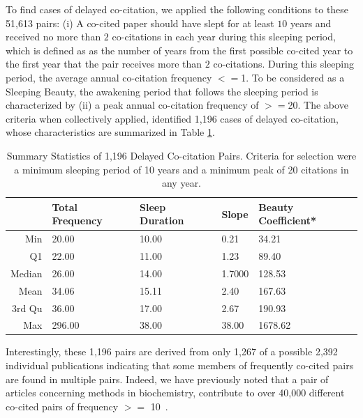 \documentclass[utf8]{frontiersSCNS}
\newcommand\Tstrut{\rule{0pt}{2.9ex}} %
\begin{document}
To find cases of delayed co-citation, we applied the following conditions to these 51,613 pairs: (i)  A co-cited paper should have slept for at least $10$ years and received no more than $2$ co-citations in each year during this sleeping period, which is defined as as the number of years from the first possible co-cited year to the first year that the pair receives more than $2$ co-citations. During this sleeping period, the average annual co-citation frequency $<=$1.  To be considered as a Sleeping Beauty, the awakening period that follows the sleeping period is characterized by (ii) a peak annual co-citation frequency of $>=$20. The above criteria when collectively applied, identified 1,196 cases of delayed co-citation, whose characteristics are summarized in Table \ref{tab:table2}. 

\begin{table}[ht]
\caption{Summary Statistics of 1,196 Delayed Co-citation Pairs. Criteria for selection were a minimum sleeping period of 10 years and a minimum peak of 20 citations in any year.}%
\centering %
\begin{center}
\begin{tabular}{rllll} 
& Total Frequency & Sleep Duration & Slope & Beauty Coefficient* \\
\hline %
Min &  20.00 & 10.00 & 0.21 & 34.21   \Tstrut\\ 
Q1  &  22.00 & 11.00  & 1.23 & 89.40   \\ 
Median & 26.00 & 14.00 & 1.7000 & 128.53   \\ 
Mean & 34.06 & 15.11 & 2.40 & 167.63   \\ 
3rd Qu & 36.00 & 17.00 & 2.67 & 190.93   \\ 
Max & 296.00 & 38.00  & 38.00  & 1678.62   \\ 
\hline
\end{tabular}
\end{center}
\label{tab:table2} %
\end{table}

Interestingly, these 1,196 pairs are derived from only 1,267 of a possible 2,392 individual publications indicating that some members of frequently co-cited pairs are found in multiple pairs. Indeed, we have previously noted that a pair of articles concerning methods in biochemistry, contribute to over 40,000 different co-cited pairs of frequency $>=$ 10~\citep{devarakonda_2020}.  
\end{document}
